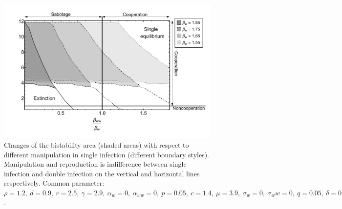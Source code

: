 \documentclass[11pt]{article}
\begin{document}
\begin{figure}[ht!]
	\centering
	\includegraphics[width=\textwidth]{Figures/ratio_reproduction_manipulation_beta.pdf}
	\caption{Changes of the bistability area (shaded areas) with respect to different manipulation in single infection (different boundary styles). Manipulation and reproduction is indifference between single infection and double infection on the vertical and horizontal lines respectively. Common parameter:  $\rho = 1.2, \ d = 0.9, \ r = 2.5, \ \gamma = 2.9, \ \alpha_w = 0, \ \alpha_{ww} = 0, \ p = 0.05, \ c = 1.4, \ \mu = 3.9, \ \sigma_w = 0, \ \sigma_ww = 0, \ q = 0.05, \ \delta = 0.9, \ k = 0.26, \  f_w = 35, h_1 = h_2 = 0.6$.}
\end{figure}



\end{document}
